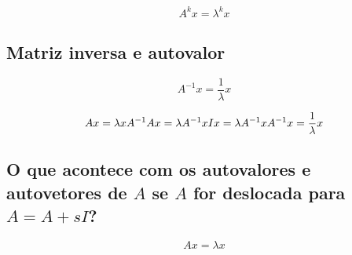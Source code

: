 \documentclass[
  letterpaper,
  DIV=11,
  numbers=noendperiod]{scrartcl}
\begin{document}
\[ A^kx = \lambda^k x\]

\hypertarget{matriz-inversa-e-autovalor}{%
\subsection{Matriz inversa e
autovalor}\label{matriz-inversa-e-autovalor}}

\[A^{-1}x = \frac{1}{\lambda}x\]

\begin{tcolorbox}[enhanced jigsaw, arc=.35mm, opacityback=0, bottomtitle=1mm, left=2mm, coltitle=black, rightrule=.15mm, colbacktitle=quarto-callout-note-color!10!white, breakable, opacitybacktitle=0.6, bottomrule=.15mm, title=\textcolor{quarto-callout-note-color}{\faInfo}\hspace{0.5em}{Prova}, titlerule=0mm, colframe=quarto-callout-note-color-frame, toprule=.15mm, toptitle=1mm, leftrule=.75mm, colback=white]
\begin{equation}
Ax = \lambda x\\
A^{-1}Ax = \lambda A^{-1}x\\
Ix = \lambda A^{-1}x\\ 
A^{-1}x = \frac{1}{\lambda}x
\end{equation}
\end{tcolorbox}

\hypertarget{o-que-acontece-com-os-autovalores-e-autovetores-de-a-se-a-for-deslocada-para-a-a-si}{%
\subsection{\texorpdfstring{O que acontece com os autovalores e
autovetores de \(A\) se \(A\) for deslocada para
\(A = A + sI\)?}{O que acontece com os autovalores e autovetores de A se A for deslocada para A = A + sI?}}\label{o-que-acontece-com-os-autovalores-e-autovetores-de-a-se-a-for-deslocada-para-a-a-si}}

\[ Ax = \lambda x\]
\end{document}
